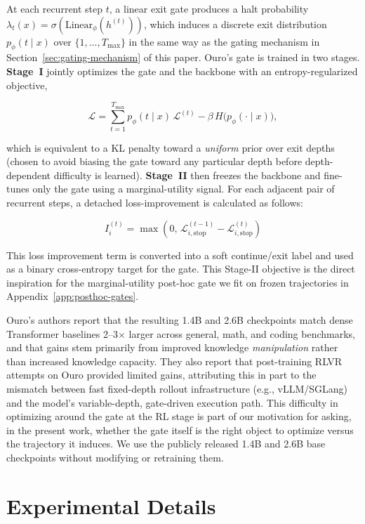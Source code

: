 \documentclass[10pt]{article} %
\begin{document}
At each recurrent step $t$, a linear exit gate produces a halt probability $\lambda_t(x) = \sigma(\mathrm{Linear}_\phi(h^{(t)}))$, which induces a discrete exit distribution $p_\phi(t\mid x)$ over $\{1,\dots,T_{\max}\}$ in the same way as the gating mechanism in Section~\ref{sec:gating-mechanism} of this paper. Ouro's gate is trained in two stages. \textbf{Stage~I} jointly optimizes the gate and the backbone with an entropy-regularized objective,

\[
\mathcal{L} = \sum_{t=1}^{T_{\max}} p_\phi(t\mid x)\,\mathcal{L}^{(t)} - \beta\, H\big(p_\phi(\cdot\mid x)\big),
\]

which is equivalent to a KL penalty toward a \emph{uniform} prior over exit depths (chosen to avoid biasing the gate toward any particular depth before depth-dependent difficulty is learned). \textbf{Stage~II} then freezes the backbone and fine-tunes only the gate using a marginal-utility signal. For each adjacent pair of recurrent steps, a detached loss-improvement is calculated as follows:

\[ I_i^{(t)} = \max(0,\, \mathcal{L}^{(t-1)}_{i,\mathrm{stop}} - \mathcal{L}^{(t)}_{i,\mathrm{stop}}) 
\]

This loss improvement term is converted into a soft continue/exit label and used as a binary cross-entropy target for the gate. This Stage-II objective is the direct inspiration for the marginal-utility post-hoc gate we fit on frozen trajectories in Appendix~\ref{app:posthoc-gates}.

Ouro's authors report that the resulting 1.4B and 2.6B checkpoints match dense Transformer baselines 2--3$\times$ larger across general, math, and coding benchmarks, and that gains stem primarily from improved knowledge \emph{manipulation} rather than increased knowledge capacity. They also report that post-training RLVR attempts on Ouro provided limited gains, attributing this in part to the mismatch between fast fixed-depth rollout infrastructure (e.g., vLLM/SGLang) and the model's variable-depth, gate-driven execution path. This difficulty in optimizing around the gate at the RL stage is part of our motivation for asking, in the present work, whether the gate itself is the right object to optimize versus the trajectory it induces. We use the publicly released 1.4B and 2.6B base checkpoints without modifying or retraining them.

\section{Experimental Details}
\label{app:experimental_details}
\end{document}
